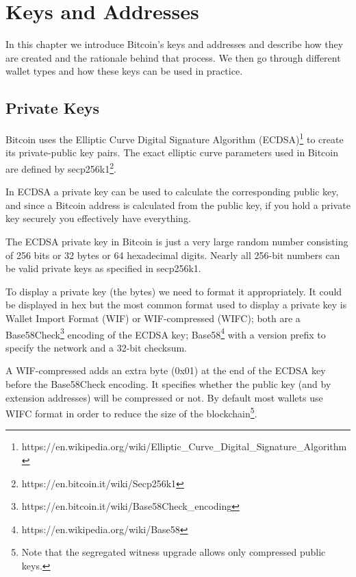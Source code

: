 \chapter{Keys and Addresses}
\label{ch:keys-and-addresses}

\begin{summary}
In this chapter we introduce Bitcoin’s keys and addresses and describe how they are created and the rationale behind that process. We then go through different wallet types and how these keys can be used in practice.
\end{summary}

\section{Private Keys}
Bitcoin uses the Elliptic Curve Digital Signature Algorithm (ECDSA)\footnote{https://en.wikipedia.org/wiki/Elliptic\_Curve\_Digital\_Signature\_Algorithm} to create its private-public key pairs. The exact elliptic curve parameters used in Bitcoin are defined by secp256k1\footnote{https://en.bitcoin.it/wiki/Secp256k1}.

\begin{note}
In ECDSA a private key can be used to calculate the corresponding public key, and since a Bitcoin address is calculated from the public key, if you hold a private key securely you effectively have everything.
\end{note}

The ECDSA private key in Bitcoin is just a very large random number consisting of 256 bits or 32 bytes or 64 hexadecimal digits. Nearly all 256-bit numbers can be valid private keys as specified in secp256k1.

To display a private key (the bytes) we need to format it appropriately. It could be displayed in hex but the most common format used to display a private key is Wallet Import Format (WIF) or WIF-compressed (WIFC); both are a Base58Check\footnote{https://en.bitcoin.it/wiki/Base58Check\_encoding} encoding of the ECDSA key; Base58\footnote{https://en.wikipedia.org/wiki/Base58} with a version prefix to specify the network and a 32-bit checksum.

A WIF-compressed adds an extra byte (0x01) at the end of the ECDSA key before the Base58Check encoding. It specifies whether the public key (and by extension addresses) will be compressed or not. By default most wallets use WIFC format in order to reduce the size of the blockchain\footnote{Note that the segregated witness upgrade allows only compressed public keys.}.


